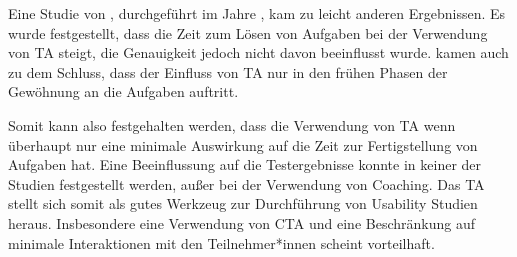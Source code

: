 Eine Studie von \citeauthor{rheniusEvaluationConcurrent1990}, durchgeführt im Jahre \citeyear{rheniusEvaluationConcurrent1990}, kam zu leicht anderen Ergebnissen. Es wurde festgestellt, dass die Zeit zum Lösen von Aufgaben bei der Verwendung von \ac{TA} steigt, die Genauigkeit jedoch nicht davon beeinflusst wurde. \citeauthor{rheniusEvaluationConcurrent1990} kamen auch zu dem Schluss, dass der Einfluss von \ac{TA} nur in den frühen Phasen der Gewöhnung an die Aufgaben auftritt.
\cite{rheniusEvaluationConcurrent1990}

Somit kann also festgehalten werden, dass die Verwendung von \ac{TA} wenn überhaupt nur eine minimale Auswirkung auf die Zeit zur Fertigstellung von Aufgaben hat. Eine Beeinflussung auf die Testergebnisse konnte in keiner der Studien festgestellt werden, außer bei der Verwendung von Coaching. Das \acl{TA} stellt sich somit als gutes Werkzeug zur Durchführung von Usability Studien heraus. Insbesondere eine Verwendung von \acl{CTA} und eine Beschränkung auf minimale Interaktionen mit den Teilnehmer*innen scheint vorteilhaft.
